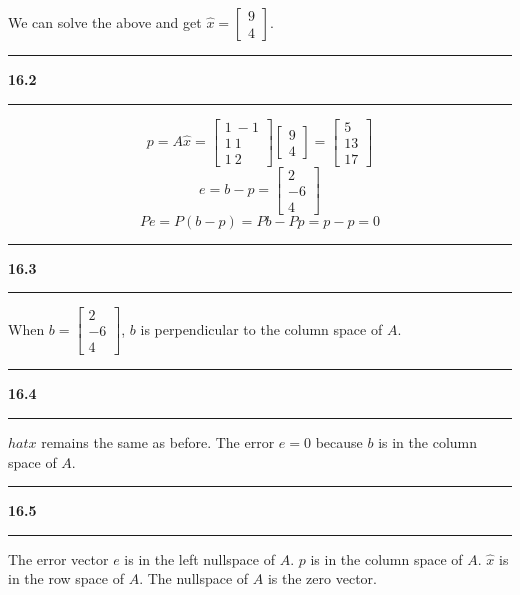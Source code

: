 \documentclass[11pt]{article}
\newcommand\question[2]{\vspace{.25in}\hrule\textbf{#1 #2}\vspace{.5em}\hrule\vspace{.10in}}
\begin{document}
We can solve the above and get \(\hat{x} = \begin{bmatrix} 9 \\ 4 \end{bmatrix}\).

\question{16.2}{}
$$p = A\hat{x} = \begin{bmatrix} 1 \ -1 \\ 1 \ 1 \\ 1 \ 2 \end{bmatrix}\begin{bmatrix} 9 \\ 4 \end{bmatrix} = \begin{bmatrix} 5 \\ 13 \\ 17 \end{bmatrix}$$
$$e = b - p = \begin{bmatrix} 2 \\ -6 \\ 4 \end{bmatrix}$$
$$Pe = P(b - p) = Pb - Pp = p - p = 0$$

\question{16.3}{}
When \(b = \begin{bmatrix} 2 \\ -6 \\ 4 \end{bmatrix}\), \(b\) is perpendicular to the column space of \(A\).

\question{16.4}{}
\(hat{x}\) remains the same as before. The error \(e = 0\) because \(b\) is in the column space of \(A\).

\question{16.5}{}
The error vector \(e\) is in the left nullspace of \(A\). \(p\) is in the column space of \(A\). \(\hat{x}\) is in the row space of \(A\). The nullspace of \(A\) is the zero vector.
\end{document}

